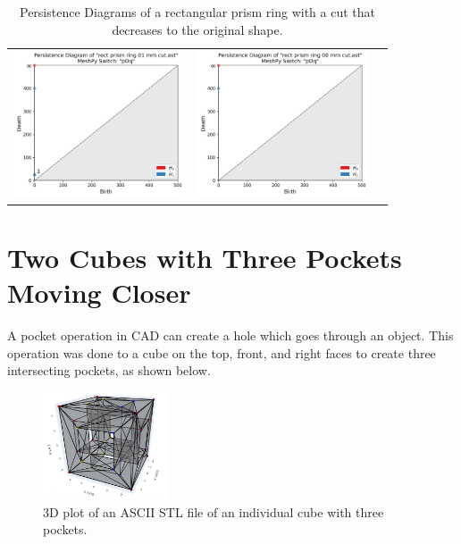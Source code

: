 \documentclass[ma]{uncgdissertationexp}
\theoremstyle{plain}
\theoremstyle{definition}
\theoremstyle{remark}
\begin{document}
\begin{table}[H]
\begin{center}
\begin{tabular}{ccc}
         \includegraphics[width=2in]{Final Run, (rect prism ring 01 mm cut) persdia.png} &
         \includegraphics[width=2in]{Final Run, (rect prism ring 00 mm cut) persdia.png} \\
    \end{tabular}
    \end{center}
    \caption{Persistence Diagrams of a rectangular prism ring with a cut that decreases to the original shape.}
    \label{fig:rect_prism_ring_persdia_table}
\end{table}

\newpage
\section{Two Cubes with Three Pockets Moving Closer}
A pocket operation in CAD can create a hole which goes through an object. This operation was done to a cube on the top, front, and right faces to create three intersecting pockets, as shown below.
\begin{figure}[H]
\begin{center}
	\includegraphics[height=1.25in]{one cube three pockets each.png}
    \caption{3D plot of an ASCII STL file of an individual cube with three pockets.}
\label{fig:ast_tetrahedrons}
\end{center}
\end{figure}
\end{document}
